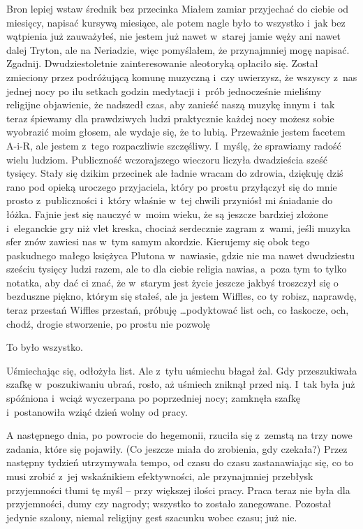 \documentclass[oneside,polish,11pt,rmheadings]{mwbk}
\begin{document}
Bron lepiej wstaw średnik bez przecinka Miałem zamiar przyjechać do ciebie od miesięcy, napisać kursywą miesiące, ale potem nagle było to wszystko i~jak bez wątpienia już zauważyłeś, nie jestem już nawet w~starej jamie węży ani nawet dalej Tryton, ale na Neriadzie, więc pomyślałem, że przynajmniej mogę napisać. Zgadnij. Dwudziestoletnie zainteresowanie aleotoryką opłaciło się. Został zmieciony przez podróżującą komunę muzyczną i~czy uwierzysz, że wszyscy z~nas jednej nocy po ilu setkach godzin medytacji i~prób jednocześnie mieliśmy religijne objawienie, że nadszedł czas, aby zanieść naszą muzykę innym i~tak teraz śpiewamy dla prawdziwych ludzi praktycznie każdej nocy możesz sobie wyobrazić moim głosem, ale wydaje się, że to lubią. Przeważnie jestem facetem A-i-R, ale jestem z~tego rozpaczliwie szczęśliwy. I~myślę, że sprawiamy radość wielu ludziom. Publiczność wczorajszego wieczoru liczyła dwadzieścia sześć tysięcy. Stały się dzikim przecinek ale ładnie wracam do zdrowia, dziękuję dziś rano pod opieką uroczego przyjaciela, który po prostu przyłączył się do mnie prosto z~publiczności i~który właśnie w~tej chwili przyniósł mi śniadanie do łóżka. Fajnie jest się nauczyć w~moim wieku, że są jeszcze bardziej złożone i~eleganckie gry niż vlet kreska, chociaż serdecznie zagram z~wami, jeśli muzyka sfer znów zawiesi nas w~tym samym akordzie. Kierujemy się obok tego paskudnego małego księżyca Plutona w~nawiasie, gdzie nie ma nawet dwudziestu sześciu tysięcy ludzi razem, ale to dla ciebie religia nawias, a~poza tym to tylko notatka, aby dać ci znać, że w~starym jest życie jeszcze jakbyś troszczył się o~ bezduszne piękno, którym się stałeś, ale ja jestem Wiffles, co ty robisz, naprawdę, teraz przestań Wiffles przestań, próbuję \ldots  podyktować list och, co łaskocze, och, chodź, drogie stworzenie, po prostu nie pozwolę 

To było wszystko. 

Uśmiechając się, odłożyła list. Ale z~tyłu uśmiechu błagał żal. Gdy przeszukiwała szafkę w~poszukiwaniu ubrań, rosło, aż uśmiech zniknął przed nią. I~tak była już spóźniona i~wciąż wyczerpana po poprzedniej nocy; zamknęła szafkę i~postanowiła wziąć dzień wolny od pracy. 

A następnego dnia, po powrocie do hegemonii, rzuciła się z~zemstą na trzy nowe zadania, które się pojawiły. (Co jeszcze miała do zrobienia, gdy czekała?) Przez następny tydzień utrzymywała tempo, od czasu do czasu zastanawiając się, co to musi zrobić z~jej wskaźnikiem efektywności, ale przynajmniej przebłysk przyjemności tłumi tę myśl -- przy większej ilości pracy. Praca teraz nie była dla przyjemności, dumy czy nagrody; wszystko to zostało zanegowane. Pozostał jedynie szalony, niemal religijny gest szacunku wobec czasu; już nie. 
\end{document}
